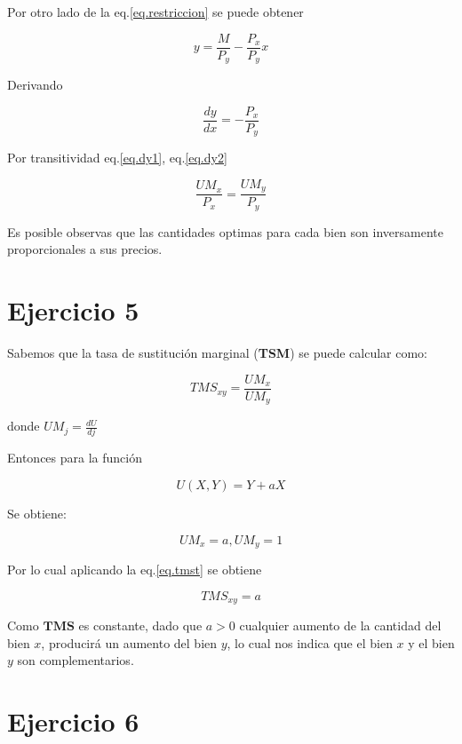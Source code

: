 \documentclass[letterpaper]{article}
\begin{document}
Por otro lado de la eq.\ref{eq.restriccion} se puede obtener 

\begin{equation}
y = \frac{M}{P_y} - \frac{P_x}{P_y}x
\end{equation}

Derivando 

\begin{equation}
\label{eq.dy2}
\frac{dy}{dx}=-\frac{P_x}{P_y}
\end{equation}

Por transitividad eq.\ref{eq.dy1}, eq.\ref{eq.dy2}

\begin{equation}
\frac{UM_x}{P_x}=\frac{UM_y}{P  _y}
\end{equation}

Es posible observas que las cantidades optimas para cada bien son
inversamente proporcionales a sus precios.

\section{Ejercicio 5}

Sabemos que la tasa de sustitución marginal (\textbf{TSM}) se puede calcular
como:

\begin{equation}
\label{eq.tmst}
TMS_{xy}=\frac{UM_x}{UM_y}
\end{equation}

donde $UM_j=\frac{dU}{dj}$

Entonces para la función 

\begin{equation}
U(X,Y)=Y + aX
\end{equation}

Se obtiene:

\begin{equation}
UM_x = a , UM_y = 1
\end{equation}

Por lo cual aplicando la eq.\ref{eq.tmst} se obtiene 

\begin{equation}
TMS_{xy}=a
\end{equation}

Como $\textbf{TMS}$ es constante, dado que $a>0$ cualquier aumento de la cantidad del bien $x$, producirá 
un aumento del bien $y$, lo cual nos indica que el bien $x$ y el bien $y$ son complementarios. 

\section{Ejercicio 6}
\end{document}

